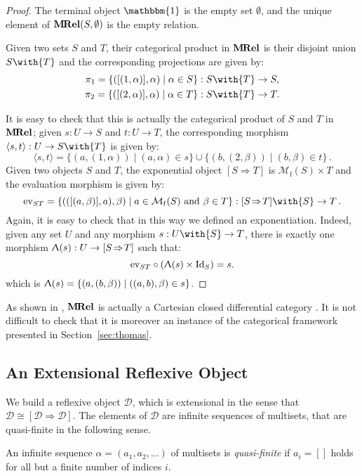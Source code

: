 \documentclass{LMCS}
\newcommand{\eval}{\mathrm{ev}}
\newcommand{\curry}{\Uplambda}
\newcommand{\st}{ \mid }
\newcommand{\MRel}{\bold{M\hspace{-1pt}Rel}}
\newcommand{\Id}[1]{\mathrm{Id}_{#1}}
\newcommand{\comp}{\circ}
\newcommand{\With}[2]{{#1}\with{#2}}
\newcommand{\Termobj}{\mathbbm{1}}
\newcommand{\Funint}[2]{[{#1}\!\imp\!{#2}]}
\newcommand{\Mfin}[1]{\mathcal{M}_{\mathrm{f}}(#1)}
\newcommand{\Pair}[2]{\langle{#1},{#2}\rangle}
\newcommand{\imp}{\Rightarrow}
\newcommand{\ga}{\alpha}
\newcommand{\gb}{\beta}
\newcommand{\cD}{\mathcal{D}}
\begin{document}
\begin{proof} The terminal object $\Termobj$ is the empty set $\emptyset$, and the unique element of
$\MRel(S,\emptyset)$ is the empty relation.

Given two sets $S$ and $T$, their categorical product in $\MRel$ is
their disjoint union $\With{S}{T}$ and the corresponding projections are given by:
\begin{gather*} 
	 \Proj{1}=\{([(1,\ga)],\ga)\st \ga\in S \} : \With{S}{T}\to S,\\
	 \Proj{2}=\{([(2,\ga)],\ga)\st \ga\in T \} : \With{S}{T} \to T.
\end{gather*}

It is easy to check that this is actually the categorical product of $S$ and $T$ in $\MRel$; 
given $s : U\to S$ and $t : U\to T$, the corresponding morphism $\Pair st : U\to\With{S}{T}$ is given by:
$$
  \Pair st=\{(a,(1,\ga))\st(a,\ga)\in s\}\cup\{(b,(2,\gb))\st(b,\gb)\in t\}\,.
$$
Given two objects $S$ and $T$, the exponential object $\Funint ST$ is $\Mfin S\times T$ and the evaluation morphism is given by:
$$
\eval_{ST} =\{(([(a,\gb)],a),\gb)\st a\in\Mfin S\ \text{and}\ \gb\in T\} : \With{\Funint ST}S\to T\,.
$$
Again, it is easy to check that in this way we defined an exponentiation. 
Indeed, given any set $U$ and any morphism $s : \With US\to T$, there is exactly one morphism $\curry(s) :  U\to \Funint ST$ such that:
$$
  \eval_{ST}\comp (\curry(s)\times \Id{S}) = s.
$$
which is $\curry(s)=\{(a,(b,\gb))\st((a,b),\gb)\in s\}$. 
\end{proof}

As shown in \cite{Manzonetto10}, $\MRel$ is actually a Cartesian closed differential category \cite{BluteCS09}.
It is not difficult to check that it is moreover an instance of the categorical framework presented in Section~\ref{sec:thomas}.

\subsection{An Extensional Reflexive Object}

We build a reflexive object $\cD$, which is extensional in the sense that $\cD \cong \Funint{\cD}{\cD}$.
The elements of $\cD$ are infinite sequences of multisets, that are quasi-finite in the following sense.

\begin{defi}An infinite sequence $\ga = (a_1,a_2,\dots)$ of multisets is \emph{quasi-finite} 
if $a_i = []$ holds for all but a finite number of indices $i$.
\end{defi}
\end{document}
